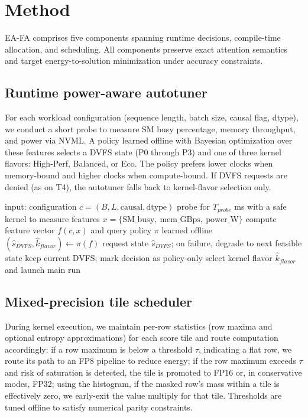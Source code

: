 \documentclass{article}
\begin{document}
\section{Method}
EA-FA comprises five components spanning runtime decisions, compile-time allocation, and scheduling. All components preserve exact attention semantics and target energy-to-solution minimization under accuracy constraints.

\subsection{Runtime power-aware autotuner}
For each workload configuration (sequence length, batch size, causal flag, dtype), we conduct a short probe to measure SM busy percentage, memory throughput, and power via NVML. A policy learned offline with Bayesian optimization over these features selects a DVFS state (P0 through P3) and one of three kernel flavors: High-Perf, Balanced, or Eco. The policy prefers lower clocks when memory-bound and higher clocks when compute-bound. If DVFS requests are denied (as on T4), the autotuner falls back to kernel-flavor selection only.

\begin{algorithm}[H]
\caption{Runtime power-aware selection policy}
\begin{algorithmic}[1]
\State input: configuration \(c=(B,L,\mathrm{causal},\mathrm{dtype})\)
\State probe for \(T_{probe}\) ms with a safe kernel to measure features \(x=\{\mathrm{SM\_busy},\ \mathrm{mem\_GBps},\ \mathrm{power\_W}\}\)
\State compute feature vector \(f(c,x)\) and query policy \(\pi\) learned offline
\State \((\hat{s}_{DVFS}, \hat{k}_{flavor}) \leftarrow \pi(f)\)
  \State request state \(\hat{s}_{DVFS}\); on failure, degrade to next feasible state
\Else
  \State keep current DVFS; mark decision as policy-only
\EndIf
\State select kernel flavor \(\hat{k}_{flavor}\) and launch main run
\end{algorithmic}
\end{algorithm}

\subsection{Mixed-precision tile scheduler}
During kernel execution, we maintain per-row statistics (row maxima and optional entropy approximations) for each score tile and route computation accordingly: if a row maximum is below a threshold \(\tau\), indicating a flat row, we route its path to an FP8 pipeline to reduce energy; if the row maximum exceeds \(\tau\) and risk of saturation is detected, the tile is promoted to FP16 or, in conservative modes, FP32; using the histogram, if the masked row’s mass within a tile is effectively zero, we early-exit the value multiply for that tile. Thresholds are tuned offline to satisfy numerical parity constraints.
\end{document}

